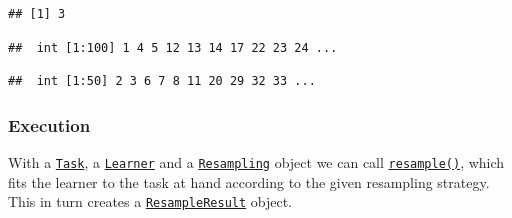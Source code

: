 \documentclass[]{article}
\newenvironment{Shaded}{\begin{snugshade}}{\end{snugshade}}
\newcommand{\DataTypeTok}[1]{\textcolor[rgb]{0.13,0.29,0.53}{#1}}
\newcommand{\DecValTok}[1]{\textcolor[rgb]{0.00,0.00,0.81}{#1}}
\newcommand{\KeywordTok}[1]{\textcolor[rgb]{0.13,0.29,0.53}{\textbf{#1}}}
\newcommand{\NormalTok}[1]{#1}
\newcommand{\OperatorTok}[1]{\textcolor[rgb]{0.81,0.36,0.00}{\textbf{#1}}}
\newcommand{\StringTok}[1]{\textcolor[rgb]{0.31,0.60,0.02}{#1}}
\renewenvironment{Shaded} {\begin{snugshade}\small} {\end{snugshade}}
\begin{document}
\begin{Shaded}
\end{Shaded}

\begin{verbatim}
## [1] 3
\end{verbatim}

\begin{Shaded}
\end{Shaded}

\begin{verbatim}
##  int [1:100] 1 4 5 12 13 14 17 22 23 24 ...
\end{verbatim}

\begin{Shaded}
\end{Shaded}

\begin{verbatim}
##  int [1:50] 2 3 6 7 8 11 20 29 32 33 ...
\end{verbatim}

\hypertarget{resampling-exec}{%
\subsubsection{Execution}\label{resampling-exec}}

With a \href{https://mlr3.mlr-org.com/reference/Task.html}{\texttt{Task}}, a \href{https://mlr3.mlr-org.com/reference/Learner.html}{\texttt{Learner}} and a \href{https://mlr3.mlr-org.com/reference/Resampling.html}{\texttt{Resampling}} object we can call \href{https://mlr3.mlr-org.com/reference/resample.html}{\texttt{resample()}}, which fits the learner to the task at hand according to the given resampling strategy.
This in turn creates a \href{https://mlr3.mlr-org.com/reference/ResampleResult.html}{\texttt{ResampleResult}} object.
\end{document}
